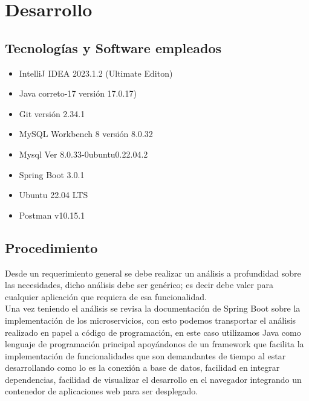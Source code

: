\section{Desarrollo}
	\subsection {Tecnologías y Software empleados}
	\begin{itemize}
		\item IntelliJ IDEA 2023.1.2 (Ultimate Editon)
		\item Java correto-17 versión 17.0.17)
		\item Git versión 2.34.1
		\item MySQL Workbench 8 versión 8.0.32
		\item Mysql Ver 8.0.33-0ubuntu0.22.04.2
		\item Spring Boot 3.0.1
		\item Ubuntu 22.04 LTS
		\item Postman v10.15.1
	\end{itemize}
	\subsection{Procedimiento}
	Desde un requerimiento general se debe realizar un análisis a profundidad sobre las necesidades, dicho análisis debe ser genérico; es decir debe valer para cualquier aplicación que requiera de esa funcionalidad.\\
	
	Una vez teniendo el análisis se revisa la documentación de Spring Boot sobre la implementación de los microservicios, con esto podemos transportar el análisis realizado en papel a código de programación, en este caso utilizamos Java como lenguaje de programación principal apoyándonos de un framework que facilita la implementación de funcionalidades que son demandantes de tiempo al estar desarrollando como lo es la conexión a base de datos, facilidad en integrar dependencias, facilidad de visualizar el desarrollo en el navegador integrando un contenedor de aplicaciones web para ser desplegado.
	
